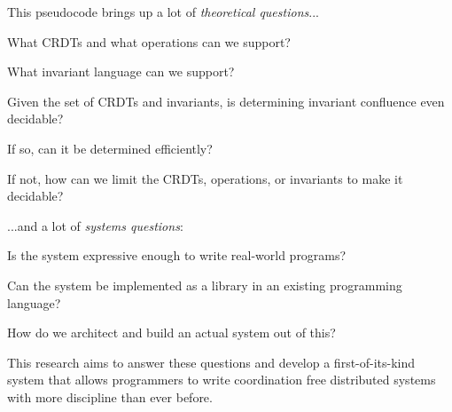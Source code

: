 \documentclass{tex/mjw}
\begin{document}
This pseudocode brings up a lot of \emph{theoretical questions}...
\begin{inparaitem}
  \item What CRDTs and what operations can we support?
  \item What invariant language can we support?
  \item Given the set of CRDTs and invariants, is determining invariant
    confluence even decidable?
  \item If so, can it be determined efficiently?
  \item If not, how can we limit the CRDTs, operations, or invariants to make
    it decidable?
\end{inparaitem}
...and a lot of \emph{systems questions}:
\begin{inparaitem}
  \item Is the system expressive enough to write real-world programs?
  \item Can the system be implemented as a library in an existing programming
    language?
  \item How do we architect and build an actual system out of this?
\end{inparaitem}

This research aims to answer these questions and develop a first-of-its-kind
system that allows programmers to write coordination free distributed systems
with more discipline than ever before.



\end{document}
